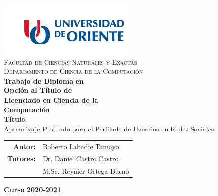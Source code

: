 \documentclass[11pt, letterpaper]{report}
\begin{document}
	\begin{titlepage}
	\begin{minipage}[t]{0.48\textwidth}
		\BgThispage
		\parbox{\textwidth}{}
	\end{minipage}
	\begin{minipage}[t]{0.55\textwidth}
			\parbox{\textwidth}{
				\includegraphics[width=.8\textwidth]{images/logo.png}\\[0.5cm]
				\centering\textsc{Facultad de Ciencias Naturales y Exactas}\\[0.2cm]
				\centering\textsc{Departamento de Ciencia de la Computación}\\[2.2cm]
				\textbf{\LARGE Trabajo de Diploma en\\[-.1cm]Opción al Título de\\[-.1cm]Licenciado en Ciencia de la\\[-.1cm]Computación\\[2.2cm]}
				\Large  \textbf{Título}:\\
				\fontsize{18pt}{20pt}\selectfont Aprendizaje Profundo para el Perfilado de Usuarios en Redes Sociales\\
				\vspace{10mm}
				\begin{tabular}{rp{}}
					{\Large \bf Autor:} & {\Large Roberto Labadie Tamayo} \\[.5cm]
					{\Large \bf Tutores:} & {\Large Dr. Daniel Castro Castro} \\[.5cm]
					& {\Large M.Sc. Reynier Ortega Bueno} \\[.5cm]
				\end{tabular}
				
				\vspace{10mm}
				{\Large \textbf{Curso 2020-2021}}
			}
	\end{minipage}
	\end{titlepage}
	
	\thispagestyle{empty} 	
	\chapterfont{\flushright}
	\renewcommand{\contentsname}{Contenido} \tableofcontents
	\renewcommand{\listfigurename}{Lista de Figuras} \listoffigures	
	\renewcommand{\listtablename}{Lista de Tablas} \listoftables
	\renewcommand{\tablename}{Tabla}
	\clearpage

	
	
	
	
	
	
	\renewcommand{\bibname}{Referencias Bibliográficas}
	
	
\end{document}
